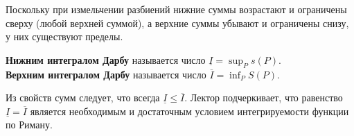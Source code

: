 Поскольку при измельчении разбиений нижние суммы возрастают и ограничены сверху (любой верхней суммой), а верхние суммы убывают и ограничены снизу, у них существуют пределы.

\begin{definition}
\textbf{Нижним интегралом Дарбу} называется число $\underline{I} = \sup_P s(P)$.\\
\textbf{Верхним интегралом Дарбу} называется число $\overline{I} = \inf_P S(P)$.
\end{definition}

Из свойств сумм следует, что всегда $\underline{I} \le \overline{I}$. Лектор подчеркивает, что равенство $\underline{I} = \overline{I}$ является необходимым и достаточным условием интегрируемости функции по Риману.


